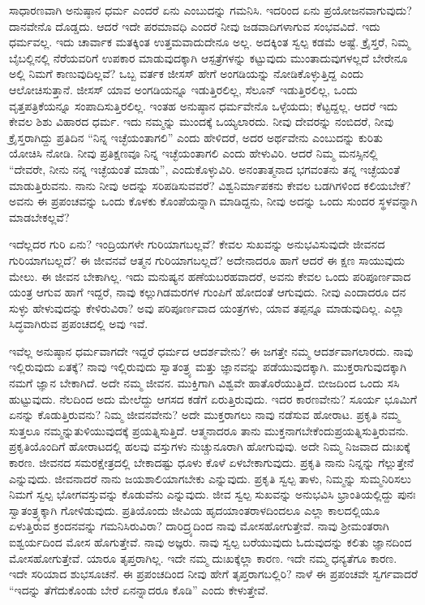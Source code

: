 ಸಾಧಾರಣವಾಗಿ ಅನುಷ್ಠಾನ ಧರ್ಮ ಎಂದರೆ ಏನು ಎಂಬುದನ್ನು ಗಮನಿಸಿ. ಇದರಿಂದ ಏನು ಪ್ರಯೋಜನವಾಗುವುದು? ದಾನವೇನೊ ದೊಡ್ಡದು. ಆದರೆ ಇದೇ ಪರಮಾವಧಿ ಎಂದರೆ ನೀವು ಜಡವಾದಿಗಳಾಗುವ ಸಂಭವವಿದೆ. ಇದು ಧರ್ಮವಲ್ಲ. ಇದು ಚಾರ್ವಾಕ ಮತಕ್ಕಿಂತ ಉತ್ತಮವಾದುದೇನೂ ಅಲ್ಲ. ಅದಕ್ಕಿಂತ ಸ್ವಲ್ಪ ಕಡಮೆ ಅಷ್ಟೆ. ಕ್ರೈಸ್ತರೆ, ನಿಮ್ಮ ಬೈಬಲ್ಲಿನಲ್ಲಿ ನೆರೆಯವರಿಗೆ ಉಪಕಾರ ಮಾಡುವುದಕ್ಕಾಗಿ ಆಸ್ಪತ್ರೆಗಳನ್ನು ಕಟ್ಟುವುದು ಮುಂತಾದುವುಗಳಲ್ಲದೆ ಬೇರೇನೂ ಅಲ್ಲಿ ನಿಮಗೆ ಕಾಣುವುದಿಲ್ಲವೆ? ಒಬ್ಬ ವರ್ತಕ ಜೀಸಸ್ ಹೇಗೆ ಅಂಗಡಿಯನ್ನು ನೋಡಿಕೊಳ್ಳುತ್ತಿದ್ದ ಎಂದು ಆಲೋಚಿಸುತ್ತಾನೆ. ಜೀಸಸ್ ಯಾವ ಅಂಗಡಿಯನ್ನೂ ಇಡುತ್ತಿರಲಿಲ್ಲ, ಸೆಲೂನ್ ಇಡುತ್ತಿರಲಿಲ್ಲ, ಒಂದು ವೃತ್ತಪತ್ರಿಕೆಯನ್ನೂ ಸಂಪಾದಿಸುತ್ತಿರಲಿಲ್ಲ. ಇಂತಹ ಅನುಷ್ಠಾನ ಧರ್ಮವೇನೊ ಒಳ್ಳೆಯದು; ಕೆಟ್ಟದ್ದಲ್ಲ. ಆದರೆ ಇದು ಕೇವಲ ಶಿಶು ವಿಹಾರದ ಧರ್ಮ. ಇದು ನಮ್ಮನ್ನು ಮುಂದಕ್ಕೆ ಒಯ್ಯಲಾರದು. ನೀವು ದೇವರನ್ನು ನಂಬಿದರೆ, ನೀವು ಕ್ರೈಸ್ತರಾಗಿದ್ದು ಪ್ರತಿದಿನ “ನಿನ್ನ ಇಚ್ಛೆಯಂತಾಗಲಿ” ಎಂದು ಹೇಳಿದರೆ, ಅದರ ಅರ್ಥವೇನು ಎಂಬುದನ್ನು ಕುರಿತು ಯೋಚಿಸಿ ನೋಡಿ. ನೀವು ಪ್ರತಿಕ್ಷಣವೂ ನಿನ್ನ ಇಚ್ಛೆಯಂತಾಗಲಿ ಎಂದು ಹೇಳುವಿರಿ. ಆದರೆ ನಿಮ್ಮ ಮನಸ್ಸಿನಲ್ಲಿ “ದೇವರೇ, ನೀನು ನನ್ನ ಇಚ್ಛೆಯಂತೆ ಮಾಡು'', ಎಂದುಕೊಳ್ಳುವಿರಿ. ಅನಂತಾತ್ಮನಾದ ಭಗವಂತನು ತನ್ನ ಇಚ್ಛೆಯಂತೆ ಮಾಡುತ್ತಿರುವನು. ನಾನು ನೀವು ಅದನ್ನು ಸರಿಪಡಿಸುವವರೆ? ವಿಶ್ವನಿರ್ಮಾಪಕನು ಕೇವಲ ಬಡಗಿಗಳಿಂದ ಕಲಿಯಬೇಕೆ? ಅವನು ಈ ಪ್ರಪಂಚವನ್ನು ಒಂದು ಕೊಳಕು ಕೊಂಪೆಯನ್ನಾಗಿ ಮಾಡಿದ್ದನು, ನೀವು ಅದನ್ನು ಒಂದು ಸುಂದರ ಸ್ಥಳವನ್ನಾಗಿ ಮಾಡಬೇಕಲ್ಲವೆ?

\vskip 2pt

ಇದೆಲ್ಲದರ ಗುರಿ ಏನು? ಇಂದ್ರಿಯಗಳೇ ಗುರಿಯಾಗಬಲ್ಲವೆ? ಕೇವಲ ಸುಖವನ್ನು ಅನುಭವಿಸುವುದೇ ಜೀವನದ ಗುರಿಯಾಗಬಲ್ಲದೆ? ಈ ಜೀವನವೆ ಆತ್ಮನ ಗುರಿಯಾಗಬಲ್ಲದೆ? ಅದೇನಾದರೂ ಹಾಗೆ ಆದರೆ ಈ ಕ್ಷಣ ಸಾಯುವುದು ಮೇಲು. ಈ ಜೀವನ ಬೇಕಾಗಿಲ್ಲ. ಇದು ಮನುಷ್ಯನ ಹಣೆಯಬರಹವಾದರೆ, ಅವನು ಕೇವಲ ಒಂದು ಪರಿಪೂರ್ಣವಾದ ಯಂತ್ರ ಆಗುವ ಹಾಗೆ ಇದ್ದರೆ, ನಾವು ಕಲ್ಲುಗಿಡಮರಗಳ ಗುಂಪಿಗೆ ಹೋದಂತೆ ಆಗುವುದು. ನೀವು ಎಂದಾದರೂ ದನ ಸುಳ್ಳು ಹೇಳುವುದನ್ನು ಕೇಳಿರುವಿರಾ? ಅವು ಪರಿಪೂರ್ಣವಾದ ಯಂತ್ರಗಳು, ಯಾವ ತಪ್ಪನ್ನೂ ಮಾಡುವುದಿಲ್ಲ. ಎಲ್ಲಾ ಸಿದ್ಧವಾಗಿರುವ ಪ್ರಪಂಚದಲ್ಲಿ ಅವು ಇವೆ.

\vskip 2pt

ಇವೆಲ್ಲ ಅನುಷ್ಠಾನ ಧರ್ಮವಾಗದೇ ಇದ್ದರೆ ಧರ್ಮದ ಆದರ್ಶವೇನು? ಈ ಜಗತ್ತೇ ನಮ್ಮ ಆದರ್ಶವಾಗಲಾರದು. ನಾವು ಇಲ್ಲಿರುವುದು ಏತಕ್ಕೆ? ನಾವು ಇಲ್ಲಿರುವುದು ಸ್ವಾತಂತ್ರ್ಯ ಮತ್ತು ಜ್ಞಾನವನ್ನು ಪಡೆಯುವುದಕ್ಕಾಗಿ. ಮುಕ್ತರಾಗುವುದಕ್ಕಾಗಿ ನಮಗೆ ಜ್ಞಾನ ಬೇಕಾಗಿದೆ. ಅದೇ ನಮ್ಮ ಜೀವನ. ಮುಕ್ತಿಗಾಗಿ ವಿಶ್ವವೇ ಹಾತೊರೆಯುತ್ತಿದೆ. ಬೀಜದಿಂದ ಒಂದು ಸಸಿ ಹುಟ್ಟುವುದು. ನೆಲದಿಂದ ಅದು ಮೇಲೆದ್ದು ಆಗಸದ ಕಡೆಗೆ ಏರುತ್ತಿರುವುದು. ಇದರ ಕಾರಣವೇನು? ಸೂರ್ಯ ಭೂಮಿಗೆ ಏನನ್ನು ಕೊಡುತ್ತಿರುವನು? ನಿಮ್ಮ ಜೀವನವೇನು? ಅದೇ ಮುಕ್ತರಾಗಲು ನಾವು ನಡೆಸುವ ಹೋರಾಟ. ಪ್ರಕೃತಿ ನಮ್ಮ ಸುತ್ತಲೂ ನಮ್ಮನ್ನು\break ತುಳಿಯುವುದಕ್ಕೆ ಪ್ರಯತ್ನಿಸುತ್ತಿದೆ. ಆತ್ಮನಾದರೂ ತಾನು ಮುಕ್ತನಾಗಬೇಕೆಂದು\break ಪ್ರಯತ್ನಿಸುತ್ತಿರುವನು. ಪ್ರಕೃತಿಯೊಂದಿಗೆ ಹೋರಾಟದಲ್ಲಿ ಹಲವು ವಸ್ತುಗಳು ನುಚ್ಚುನೂರಾಗಿ ಹೋಗುವುವು. ಅದೇ ನಿಮ್ಮ ನಿಜವಾದ ದುಃಖಕ್ಕೆ ಕಾರಣ. ಜೀವನದ ಸಮರಕ್ಷೇತ್ರದಲ್ಲಿ ಬೇಕಾದಷ್ಟು ಧೂಳು ಕೊಳೆ ಏಳಬೇಕಾಗುವುದು. ಪ್ರಕೃತಿ ನಾನು ನಿನ್ನನ್ನು ಗೆಲ್ಲುತ್ತೇನೆ ಎನ್ನುವುದು. ಜೀವನಾದರೆ ನಾನು ಜಯಶಾಲಿಯಾಗಬೇಕು ಎನ್ನುವುದು. ಪ್ರಕೃತಿ ಸ್ವಲ್ಪ ತಾಳು, ನಿಮ್ಮನ್ನು ಸುಮ್ಮನಿರಿಸಲು ನಿಮಗೆ ಸ್ವಲ್ಪ ಭೋಗವಸ್ತುವನ್ನು ಕೊಡುವೆನು ಎನ್ನುವುದು. ಜೀವ ಸ್ವಲ್ಪ ಸುಖವನ್ನು ಅನುಭವಿಸಿ ಭ್ರಾಂತಿಯಲ್ಲಿದ್ದು ಪುನಃ ಸ್ವಾತಂತ್ರ್ಯಕ್ಕಾಗಿ ಗೋಳಿಡುವುದು. ಪ್ರತಿಯೊಂದು ಜೀವಿಯ ಹೃದಯಾಂತರಾಳದಿಂದಲೂ ಎಲ್ಲಾ ಕಾಲದಲ್ಲಿಯೂ ಏಳುತ್ತಿರುವ ಕ್ರಂದನವನ್ನು ಗಮನಿಸಿರುವಿರಾ? ದಾರಿದ್ರ್ಯದಿಂದ ನಾವು ಮೋಸಹೋಗುತ್ತೇವೆ. ನಾವು ಶ‍್ರೀಮಂತರಾಗಿ ಐಶ್ವರ್ಯದಿಂದ ಮೋಸ ಹೊಗುತ್ತೇವೆ. ನಾವು ಅಜ್ಞರು. ನಾವು ಸ್ವಲ್ಪ ಬರೆಯುವುದು ಓದುವುದನ್ನು ಕಲಿತು ಜ್ಞಾನದಿಂದ ಮೋಸಹೋಗುತ್ತೇವೆ. ಯಾರೂ ತೃಪ್ತರಾಗಿಲ್ಲ. ಇದೇ ನಮ್ಮ ದುಃಖಕ್ಕೆಲ್ಲಾ ಕಾರಣ. ಇದೇ ನಮ್ಮ ಧನ್ಯತೆಗೂ ಕಾರಣ. ಇದೇ ಸರಿಯಾದ ಶುಭಸೂಚನೆ. ಈ ಪ್ರಪಂಚದಿಂದ ನೀವು ಹೇಗೆ ತೃಪ್ತರಾಗಬಲ್ಲಿರಿ? ನಾಳೆ ಈ ಪ್ರಪಂಚವೇ ಸ್ವರ್ಗವಾದರೆ “ಇದನ್ನು ತೆಗೆದುಕೊಂಡು ಬೇರೆ ಏನನ್ನಾದರೂ ಕೊಡಿ'' ಎಂದು ಕೇಳುತ್ತೇವೆ.

